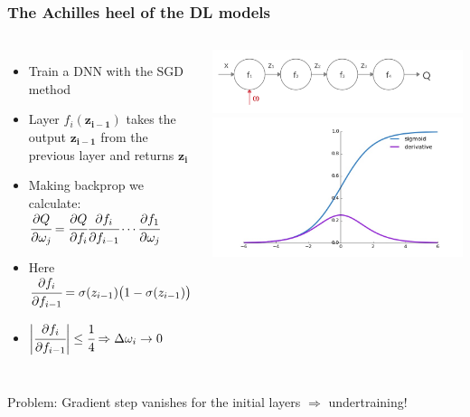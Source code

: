 \documentclass[12pt, aspectratio = 169]{beamer}
\newcommand{\red}{\color{calmRed}}
\newcommand{\black}{\color{black}}
\begin{document}
\begin{frame}[t]
	\frametitle{The Achilles heel of the DL models}
	\begin{columns}
		\begin{minipage}[t]{\linewidth}
			\begin{itemize}
				\item Train a DNN with the SGD method
				\onslide<2->\item Layer $f_i(\bm{z_{i-1}})$ takes the output $\bm{z_{i-1}}$ from the previous layer and returns $\bm{z_i}$
				\onslide<3->\item Making backprop we calculate: \\ $\cfrac{\partial Q}{\partial \omega_j} = \cfrac{\partial Q}{\partial f_i}\cfrac{\partial f_i}{\partial f_{i-1}}\cdots \cfrac{\partial f_{1}}{\partial \omega_j}$
				\onslide<4->\item Here $\cfrac{\partial f_i}{\partial f_{i-1}} = \sigma(z_{i-1})\big(1-\sigma(z_{i-1})\big)$
				\onslide<5->\item $\bigg|\cfrac{\partial f_i}{\partial f_{i-1}}\bigg| \leq \cfrac{1}{4} \Rightarrow \Delta \omega_i \rightarrow 0$
			\end{itemize}
		\end{minipage}%
		\begin{minipage}[t]{\linewidth}
		\flushleft
		\includegraphics[width=1\linewidth]{vanishing_grad_NN}\\
		\vspace{-0.5em}
		\onslide<4->\hspace{-1em}\includegraphics[width=0.9\linewidth]{sigmoid_der.jpg}
		\end{minipage}
	\end{columns}
	\vspace{1em}
 	\centering \red Problem: \black Gradient step vanishes for the initial layers $\Rightarrow$ undertraining! 
\end{frame} 
\end{document}
